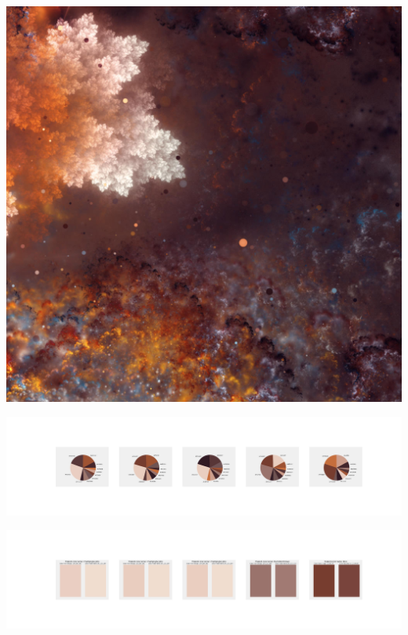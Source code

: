 \documentclass[11pt]{article}
\begin{document}
\begin{landscape}
    \begin{center}
    \includegraphics[width=\textwidth]{./nbimg/file (345).jpg}
    \end{center}

    \begin{center}
    \includegraphics[width=250mm]{./nbimg/pie-273.jpg}
    \end{center}

    \begin{center}
    \includegraphics[width=250mm]{./nbimg/peak-273.jpg}
    \end{center}
    


\end{landscape}
\end{document}
